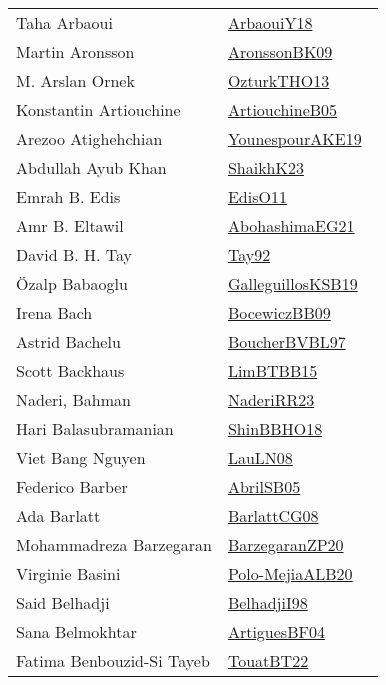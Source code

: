 {\begin{longtable}{p{4cm}p{20cm}}
Taha Arbaoui & \href{works/ArbaouiY18.pdf}{ArbaouiY18}~\cite{ArbaouiY18}\\
Martin Aronsson & \href{works/AronssonBK09.pdf}{AronssonBK09}~\cite{AronssonBK09}\\
M. Arslan Ornek & \href{works/OzturkTHO13.pdf}{OzturkTHO13}~\cite{OzturkTHO13}\\
Konstantin Artiouchine & \href{works/ArtiouchineB05.pdf}{ArtiouchineB05}~\cite{ArtiouchineB05}\\
Arezoo Atighehchian & \href{works/YounespourAKE19.pdf}{YounespourAKE19}~\cite{YounespourAKE19}\\
Abdullah Ayub Khan & \href{}{ShaikhK23}~\cite{ShaikhK23}\\
Emrah B. Edis & \href{works/EdisO11.pdf}{EdisO11}~\cite{EdisO11}\\
Amr B. Eltawil & \href{works/AbohashimaEG21.pdf}{AbohashimaEG21}~\cite{AbohashimaEG21}\\
David B. H. Tay & \href{}{Tay92}~\cite{Tay92}\\
{\"{O}}zalp Babaoglu & \href{works/GalleguillosKSB19.pdf}{GalleguillosKSB19}~\cite{GalleguillosKSB19}\\
Irena Bach & \href{}{BocewiczBB09}~\cite{BocewiczBB09}\\
Astrid Bachelu & \href{}{BoucherBVBL97}~\cite{BoucherBVBL97}\\
Scott Backhaus & \href{works/LimBTBB15.pdf}{LimBTBB15}~\cite{LimBTBB15}\\
Naderi, Bahman & \href{works/NaderiRR23.pdf}{NaderiRR23}~\cite{NaderiRR23}\\
Hari Balasubramanian & \href{works/ShinBBHO18.pdf}{ShinBBHO18}~\cite{ShinBBHO18}\\
Viet Bang Nguyen & \href{works/LauLN08.pdf}{LauLN08}~\cite{LauLN08}\\
Federico Barber & \href{works/AbrilSB05.pdf}{AbrilSB05}~\cite{AbrilSB05}\\
Ada Barlatt & \href{works/BarlattCG08.pdf}{BarlattCG08}~\cite{BarlattCG08}\\
Mohammadreza Barzegaran & \href{works/BarzegaranZP20.pdf}{BarzegaranZP20}~\cite{BarzegaranZP20}\\
Virginie Basini & \href{}{Polo-MejiaALB20}~\cite{Polo-MejiaALB20}\\
Said Belhadji & \href{works/BelhadjiI98.pdf}{BelhadjiI98}~\cite{BelhadjiI98}\\
Sana Belmokhtar & \href{works/ArtiguesBF04.pdf}{ArtiguesBF04}~\cite{ArtiguesBF04}\\
Fatima Benbouzid{-}Si Tayeb & \href{works/TouatBT22.pdf}{TouatBT22}~\cite{TouatBT22}\\

\end{longtable}}
